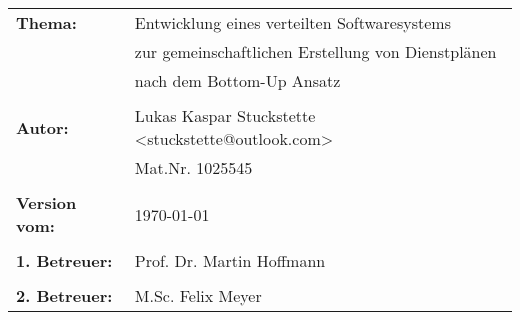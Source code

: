 \begin{titlepage}
    \begin{flushleft}
        \begin{tabular}{ll}
            \textbf{Thema:}       & Entwicklung eines verteilten Softwaresystems            \\
                                  & zur gemeinschaftlichen Erstellung von Dienstplänen      \\
                                  & nach dem Bottom-Up Ansatz                               \\
                                  &                                                         \\
            \textbf{Autor:}       & Lukas Kaspar Stuckstette <stuckstette@outlook.com>      \\
                                  & Mat.Nr. 1025545                                         \\
                                  &                                                         \\
            \textbf{Version vom:} & \today                                                  \\
                                  &                                                         \\
            \textbf{1. Betreuer:} & Prof. Dr. Martin Hoffmann                               \\
                                  &                                                         \\
            \textbf{2. Betreuer:} & M.Sc. Felix Meyer
        \end{tabular}
    \end{flushleft}

\end{titlepage}

